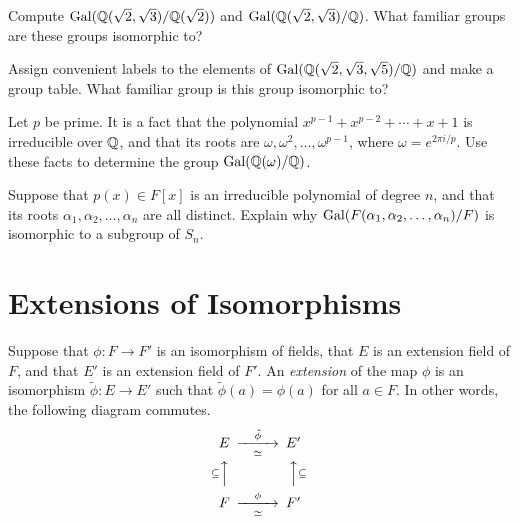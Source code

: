 \begin{problem}
    Compute $\operatorname{Gal}(\mathbb{Q}(\sqrt{2},\sqrt{3})/\mathbb{Q}(\sqrt{2}))$ and $\operatorname{Gal}(\mathbb{Q}(\sqrt{2},\sqrt{3})/\mathbb{Q})$. What familiar groups are these groups isomorphic to?
\end{problem}



\begin{problem}
    Assign convenient labels to the elements of $\operatorname{Gal}(\mathbb{Q}(\sqrt{2},\sqrt{3},\sqrt{5})/\mathbb{Q})$ and make a group table. What familiar group is this group isomorphic to?
\end{problem}



\begin{problem}
    Let $p$ be prime. It is a fact that the polynomial $x^{p-1}+x^{p-2}+\cdots+x+1$ is irreducible over $\mathbb{Q}$, and that its roots are $\omega,\omega^2,\ldots,\omega^{p-1}$, where $\omega = e^{2\pi i/p}$. Use these facts to determine the group $\operatorname{Gal}(\mathbb{Q}(\omega)/\mathbb{Q})$.
\end{problem}



\begin{problem}
    Suppose that $p(x)\in F[x]$ is an irreducible polynomial of degree $n$, and that its roots $\alpha_1,\alpha_2,\ldots,\alpha_n$ are all distinct. Explain why $\operatorname{Gal}(F(\alpha_1,\alpha_2,\ldots,\alpha_n)/F)$ is isomorphic to a subgroup of $S_n$.
\end{problem}


\section{Extensions of Isomorphisms}

\begin{definition}
    Suppose that $\phi:F \longrightarrow F'$ is an isomorphism of fields, that $E$ is an extension field of $F$, and that $E'$ is an extension field of $F'$. An \textit{extension} of the map $\phi$ is an isomorphism $\tilde{\phi}:E\longrightarrow E'$ such that $\tilde{\phi}(a)=\phi(a)$ for all $a\in F$. In other words, the following diagram commutes.
    $$
    \begin{CD}
        E              @>\tilde{\phi}>\simeq>   E' \\
        @A\subseteq AA                          @AA\subseteq A \\
        F              @>\phi>\simeq>           F'
    \end{CD}
    $$
\end{definition}

